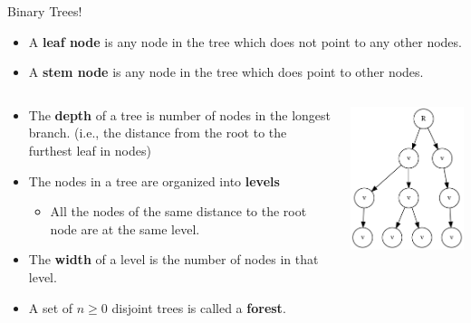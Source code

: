 \documentclass[11pt]{beamer}
\begin{document}
\begin{frame}{Binary Trees!}
\begin{itemize}
\item A \textbf{leaf node} is any node in the tree which does not point to any other nodes.
\item A \textbf{stem node} is any node in the tree which does point to other nodes.
\end{itemize}
\begin{columns}
\begin{column}{0.75\textwidth}
\begin{itemize}  
\item The \textbf{depth} of a tree is number of nodes in the longest branch.  (i.e., the distance from the root to the furthest leaf in nodes)
\item The nodes in a tree are organized into \textbf{levels}
\begin{itemize}
\item All the nodes of the same distance to the root node are at the same level.  
\end{itemize}
\item The \textbf{width} of a level is the number of nodes in that level.
\item A set of $n \geq 0$ disjoint trees is called a \textbf{forest}.
\end{itemize}
\end{column}
\begin{column}{0.25\textwidth}
\center
\includegraphics[scale=0.3]{tree1.png}
\end{column}
\end{columns}
\end{frame}
\end{document}

